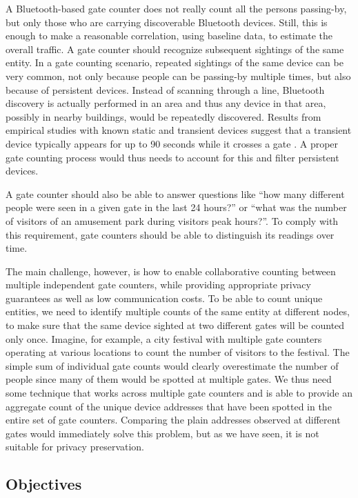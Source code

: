 A Bluetooth-based gate counter does not really count all the persons
passing-by, but only those who are carrying discoverable Bluetooth
devices. Still, this is enough to make a reasonable correlation, using
baseline data, to estimate the overall traffic. A gate counter should
recognize subsequent sightings of the same entity. In a gate counting
scenario, repeated sightings of the same device can be very common,
not only because people can be passing-by multiple times, but also
because of persistent devices. Instead of scanning through a line,
Bluetooth discovery is actually performed in an area and thus any
device in that area, possibly in nearby buildings, would be repeatedly
discovered. Results from empirical studies with known static and
transient devices suggest that a transient device typically appears
for up to 90 seconds while it crosses a gate \cite{Oneill:2006vq}. A
proper gate counting process would thus needs to account for this and
filter persistent devices.

A gate counter should also be able to answer questions like ``how many
different people were seen in a given gate in the last 24 hours?'' or
``what was the number of visitors of an amusement park during visitors
peak hours?''. To comply with this requirement, gate counters should
be able to distinguish its readings over time.

The main challenge, however, is how to enable collaborative counting
between multiple independent gate counters, while providing
appropriate privacy guarantees as well as low communication costs. To
be able to count unique entities, we need to identify multiple counts
of the same entity at different nodes, to make sure that the same
device sighted at two different gates will be counted only once.
Imagine, for example, a city festival with multiple gate counters
operating at various locations to count the number of visitors to the
festival. The simple sum of individual gate counts would clearly
overestimate the number of people since many of them would be spotted
at multiple gates. We thus need some technique that works across
multiple gate counters and is able to provide an aggregate count of
the unique device addresses that have been spotted in the entire set
of gate counters. Comparing the plain addresses observed at different
gates would immediately solve this problem, but as we have seen, it is
not suitable for privacy preservation.

\subsection{Objectives}
\label{sec:objectives}

